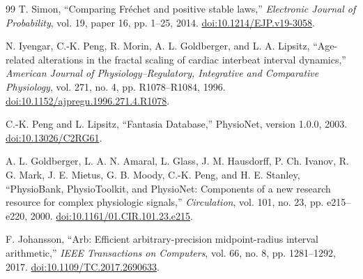 \documentclass[11pt]{article}
\theoremstyle{definition}
\theoremstyle{remark}
\begin{document}
\begin{thebibliography}{99}
T. Simon,
``Comparing Fr\'echet and positive stable laws,''
\emph{Electronic Journal of Probability}, vol. 19, paper 16, pp. 1--25,
2014.
\href{https://doi.org/10.1214/EJP.v19-3058}{doi:10.1214/EJP.v19-3058}.

N. Iyengar, C.-K. Peng, R. Morin, A. L. Goldberger, and L. A. Lipsitz,
``Age-related alterations in the fractal scaling of cardiac interbeat
interval dynamics,'' \emph{American Journal of Physiology--Regulatory,
Integrative and Comparative Physiology}, vol. 271, no. 4,
pp. R1078--R1084, 1996.
\href{https://doi.org/10.1152/ajpregu.1996.271.4.R1078}{doi:10.1152/ajpregu.1996.271.4.R1078}.

C.-K. Peng and L. Lipsitz,
``Fantasia Database,'' PhysioNet, version 1.0.0, 2003.
\href{https://doi.org/10.13026/C2RG61}{doi:10.13026/C2RG61}.

A. L. Goldberger, L. A. N. Amaral, L. Glass, J. M. Hausdorff,
P. Ch. Ivanov, R. G. Mark, J. E. Mietus, G. B. Moody, C.-K. Peng, and
H. E. Stanley,
``PhysioBank, PhysioToolkit, and PhysioNet: Components of a new research
resource for complex physiologic signals,'' \emph{Circulation}, vol. 101,
no. 23, pp. e215--e220, 2000.
\href{https://doi.org/10.1161/01.CIR.101.23.e215}{doi:10.1161/01.CIR.101.23.e215}.

F. Johansson,
``Arb: Efficient arbitrary-precision midpoint-radius interval arithmetic,''
\emph{IEEE Transactions on Computers}, vol. 66, no. 8,
pp. 1281--1292, 2017.
\href{https://doi.org/10.1109/TC.2017.2690633}{doi:10.1109/TC.2017.2690633}.

\end{thebibliography}
\end{document}
